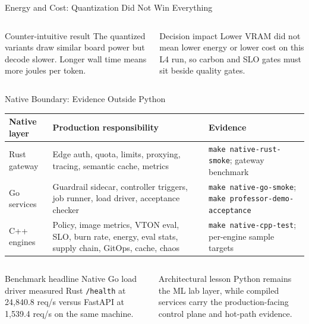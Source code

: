 \documentclass[aspectratio=169,10pt]{beamer}
\newcommand{\source}[1]{%
}
\begin{document}
\begin{frame}{Energy and Cost: Quantization Did Not Win Everything}
  \vspace{0.2cm}
  \begin{columns}[T,totalwidth=\textwidth]
    \begin{alertblock}{Counter-intuitive result}
      The quantized variants draw similar board power but decode slower. Longer wall time means more joules per token.
    \end{alertblock}
    \begin{exampleblock}{Decision impact}
      Lower VRAM did not mean lower energy or lower cost on this L4 run, so carbon and SLO gates must sit beside quality gates.
    \end{exampleblock}
  \end{columns}
  \source{\texttt{reports/benchmark\_run\_report.md}, Section 4; \texttt{docs/carbon\_power\_methodology.md}.}
\end{frame}

\begin{frame}{Native Boundary: Evidence Outside Python}
  \scriptsize
  \renewcommand{\arraystretch}{1.12}
  \begin{tabularx}{\textwidth}{>{\RaggedRight\arraybackslash}p{2.3cm} Y >{\RaggedRight\arraybackslash}p{3.5cm}}
    \toprule
    \textbf{Native layer} & \textbf{Production responsibility} & \textbf{Evidence} \\
    \midrule
    Rust gateway & Edge auth, quota, limits, proxying, tracing, semantic cache, metrics & \texttt{make native-rust-smoke}; gateway benchmark \\
    \addlinespace
    Go services & Guardrail sidecar, controller triggers, job runner, load driver, acceptance checker & \texttt{make native-go-smoke}; \texttt{make professor-demo-acceptance} \\
    \addlinespace
    C++ engines & Policy, image metrics, VTON eval, SLO, burn rate, energy, eval stats, supply chain, GitOps, cache, chaos & \texttt{make native-cpp-test}; per-engine sample targets \\
    \bottomrule
  \end{tabularx}

  \vspace{0.25cm}
  \begin{columns}[T,totalwidth=\textwidth]
    \begin{block}{Benchmark headline}
      Native Go load driver measured Rust \texttt{/health} at 24,840.8 req/s versus FastAPI at 1,539.4 req/s on the same machine.
    \end{block}
    \begin{exampleblock}{Architectural lesson}
      Python remains the ML lab layer, while compiled services carry the production-facing control plane and hot-path evidence.
    \end{exampleblock}
  \end{columns}
  \source{\texttt{native/README.md}; \texttt{reports/benchmark\_run\_report.md}; \texttt{docs/adr/0003-native-production-boundary.md}.}
\end{frame}
\end{document}
